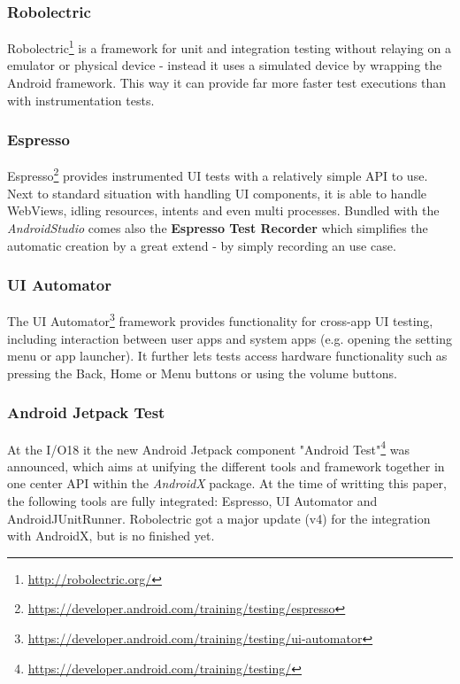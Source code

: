 \subsubsection{Robolectric}
Robolectric\footnote{\url{http://robolectric.org/}} is a framework for unit and integration testing without relaying on a emulator or physical device - instead it uses a simulated device by wrapping the Android framework. This way it can provide far more faster test executions than with instrumentation tests.

\subsubsection{Espresso}
Espresso\footnote{\url{https://developer.android.com/training/testing/espresso}} provides instrumented UI tests with a relatively simple API to use. Next to standard situation with handling UI components, it is able to handle WebViews, idling resources, intents and even multi processes.
Bundled with the \textit{AndroidStudio} comes also the \textbf{Espresso Test Recorder} which simplifies the automatic creation by a great extend - by simply recording an use case.

\subsubsection{UI Automator}
The UI Automator\footnote{\url{https://developer.android.com/training/testing/ui-automator}} framework provides functionality for cross-app UI testing, including interaction between user apps and system apps (e.g. opening the setting menu or app launcher). It further lets tests access hardware functionality such as pressing the Back, Home or Menu buttons or using the volume buttons.

\subsubsection{Android Jetpack Test}

At the I/O18 it the new Android Jetpack component "Android Test"\footnote{\url{https://developer.android.com/training/testing/}} was announced, which aims at unifying the different tools and framework together in one center API within the \textit{AndroidX} package.
At the time of writting this paper, the following tools are fully integrated: Espresso, UI Automator and AndroidJUnitRunner. Robolectric got a major update (v4) for the integration with AndroidX, but is no finished yet.

